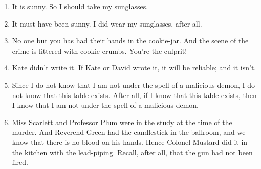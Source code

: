 \begin{practiceproblems}
\begin{enumerate}
	\item It is sunny. So I should take my sunglasses.
	\item It must have been sunny. I did wear my sunglasses, after all.
	\item No one but you has had their hands in the cookie-jar. And the scene of the crime is littered with cookie-crumbs. You're the culprit! 
	\item Kate didn't write it. If Kate or David wrote it, it will be reliable; and it isn’t.
	\item  Since I do not know that I am not under the spell of a malicious demon, I do not know that this table exists. After all, if I know that this table exists, then I know that I am not under the spell of a malicious demon.
	\item Miss Scarlett and Professor Plum were in the study at the time of the murder. And Reverend Green had the candlestick in the ballroom, and we know that there is no blood on his hands. Hence Colonel Mustard did it in the kitchen with the lead-piping. Recall, after all, that the gun had not been fired.

\end{enumerate}
\end{practiceproblems}
